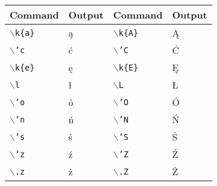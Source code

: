 \documentclass[a4paper,11pt]{article}
\begin{document}
\begin{table}[htbp]


\begin{center}
\begin{tabular}{|ll|ll|}
\hline
Command & Output & Command & Output\\ 
\hline
\texttt{$\backslash$k\{a\}} & \k{a} & $\backslash$\texttt{k\{A\}} & \k{A}\\
\texttt{$\backslash$'c} & \'c & \texttt{$\backslash$'C} & \'C \\
\texttt{$\backslash$k\{e\}} & \k{e} & $\backslash$\texttt{k\{E\}} & \k{E}\\
\texttt{$\backslash$l} & \l & \texttt{$\backslash$L} & \L\\	%
\texttt{$\backslash$'o} & \'o & \texttt{$\backslash$'O} & \'O \\
\texttt{$\backslash$'n} & \'n & \texttt{$\backslash$'N} & \'N \\	%
\texttt{$\backslash$'s} & \'s & \texttt{$\backslash$'S} & \'S \\
\texttt{$\backslash$'z} & \'z & \texttt{$\backslash$'Z} & \'Z \\
\texttt{$\backslash$.z} & \.z & \texttt{$\backslash$.Z} & \.Z \\
\hline
\end{tabular}
\end{center}
\end{table}
\end{document}
